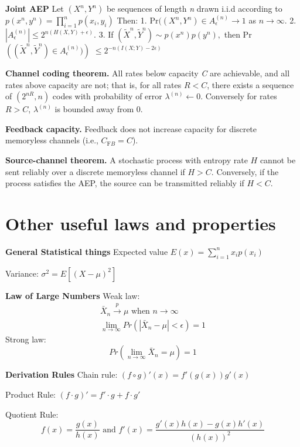 \documentclass[10pt]{article}
\begin{document}
\begin{tiny}
\begin{multicols}{3}
{\bf Joint AEP} Let $(X^{n}, Y^{n})$ be sequences of length {\it n} drawn i.i.d according to $p(x^{n},y^{n})=\prod_{i=1}^{n}p(x_{i},y_{i})$ Then: 1. Pr$((X^{n},Y^{n}) \in A_{\epsilon}^{(n)}\rightarrow 1$ as $n\rightarrow \infty$. 2. $|A_{\epsilon}^{(n)}|\leq 2^{n(H(X,Y)+\epsilon)}$. 3. If $(\tilde{X}^{n}, \tilde{Y}^{n})\sim p(x^{n})p(y^{n}),$ then Pr$\left( (\tilde{X}^{n},\tilde{Y}^{n})\in A_{\epsilon}^{(n)} )\right) $ $\leq 2^{-n(I(X;Y)-2\epsilon)}$

{\bf Channel coding theorem.} All rates below capacity {\it C} are achievable, and all rates above capacity are not; that is, for all rates $R<C$, there exists a sequence of $(2^{nR},n)$ codes with probability of error $\lambda^{(n)}\leftarrow 0$. Conversely for rates $R>C$, $\lambda^{(n)}$ is bounded away from 0.

{\bf Feedback capacity.} Feedback does not increase capacity for discrete memoryless channels (i.e., $C_{\text{F}B} = C$).

{\bf Source-channel theorem.} A stochastic process with entropy rate $H$ cannot be sent reliably over a discrete memoryless channel if $H > C$. Conversely, if the process satisfies the AEP, the source can be transmitted reliably if $H<C$.



\section*{Other useful laws and properties}
{\bf General Statistical things} Expected value $E(x)=\sum_{i=1}^n x_i p(x_i)$

Variance: $\sigma^2 = E\left[ \left(X-\mu\right)^2\right]$

{\bf Law of Large Numbers} Weak law:
\begin{eqnarray*}
\bar{X}_n\overset{p}\rightarrow \mu \text{ when } n \rightarrow \infty\\
\lim_{n\rightarrow \infty} Pr\left(|\bar{X}_n-\mu| < \epsilon \right) = 1
\end{eqnarray*}
Strong law:
\begin{equation}
Pr\left(\lim_{n\rightarrow \infty} \bar{X}_n = \mu \right) = 1
\end{equation}

{\bf Derivation Rules} Chain rule: $(f \circ g)'(x)=f'(g(x))g'(x)$

Product Rule: $(f\cdot g)' = f' \cdot g + f \cdot g'$

Quotient Rule: \[f(x)=\frac{g(x)}{h(x)}\text{ and }f'(x)=\frac{g'(x)h(x)-g(x)h'(x)}{\left(h(x)\right)^2}\]


\end{multicols}
\end{tiny}
\end{document}
